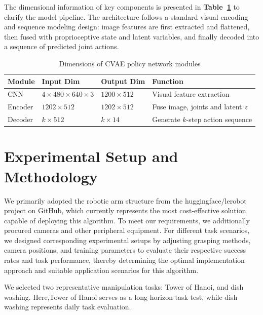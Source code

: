 \documentclass[runningheads]{llncs}
\begin{document}
The dimensional information of key components is presented in \textbf{Table~\ref{tab:dim_summary}} to clarify the model pipeline. The architecture follows a standard visual encoding and sequence modeling design: image features are first extracted and flattened, then fused with proprioceptive state and latent variables, and finally decoded into a sequence of predicted joint actions.


\begin{table}[htbp]
    \centering
	\caption{Dimensions of CVAE policy network modules}
	\label{tab:dim_summary}
	\begin{tabularx}{\textwidth}{@{}>{\hsize=0.5\hsize\centering\arraybackslash}X 
			>{\hsize=1.0\hsize\centering\arraybackslash}X 
			>{\hsize=0.8\hsize\centering\arraybackslash}X 
			>{\hsize=1.7\hsize\centering\arraybackslash}X@{}}
		\toprule
		\textbf{Module} & \textbf{Input Dim} & \textbf{Output Dim} & \textbf{Function} \\
		\midrule
		CNN & $4 \times 480 \times 640 \times 3$ & $1200 \times 512$ & Visual feature extraction \\
		Encoder & $1202 \times 512$ & $1202 \times 512$ & Fuse image, joints and latent $z$ \\
		Decoder & $k \times 512$ & $k \times 14$ & Generate $k$-step action sequence \\
		\bottomrule
	\end{tabularx}
\end{table}

\section{Experimental Setup and Methodology}
We primarily adopted the robotic arm structure from the huggingface/lerobot project on GitHub, which currently represents the most cost-effective solution capable of deploying this algorithm. To meet our requirements, we additionally procured cameras and other peripheral equipment. For different task scenarios, we designed corresponding experimental setups by adjusting grasping methods, camera positions, and training parameters to evaluate their respective success rates and task performance, thereby determining the optimal implementation approach and suitable application scenarios for this algorithm.

We selected two representative manipulation tasks: Tower of Hanoi, and dish washing. Here,Tower of Hanoi serves as a long-horizon task test, while dish washing represents daily task evaluation.
\end{document}
